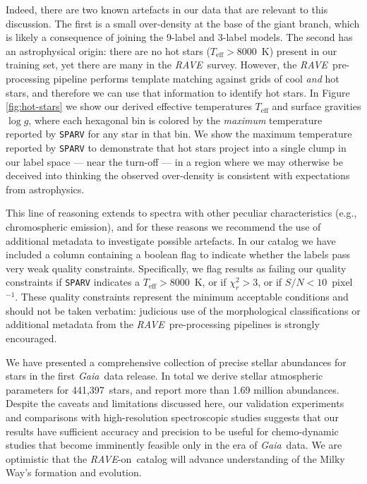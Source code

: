 \documentclass[preprint]{aastex}
\newcommand{\acronym}[1]{{\small{#1}}}
\newcommand{\project}[1]{\textsl{#1}}
\newcommand{\gaia}{\project{Gaia}}
\newcommand{\rave}{\project{\acronym{RAVE}}}
\newcommand{\raveon}{\rave-on}
\newcommand{\teff}{T_{\mathrm{eff}}}
\newcommand{\logg}{\log g}
\newcommand{\ReportedStellarParameters}{441,397} %
\begin{document}
Indeed, there are two known artefacts in our data that are relevant to this 
discussion. The first is a small over-density at the base of the giant branch, 
which is likely a consequence of joining the 9-label and 3-label models.  The
second has an astrophysical origin: there are no hot stars ($\teff > 8000$~K)
present in our training set, yet there are many in the \rave\ survey.
However, the \rave\ pre-processing pipeline 
\citep[\texttt{SPARV};][]{Steinmetz_2006,Zwitter_2008} performs template 
matching against grids of cool \emph{and} hot stars, and therefore we can use 
that information to identify hot stars.  In Figure \ref{fig:hot-stars} 
we show our derived effective temperatures $\teff$ and surface gravities $\logg$,
where each hexagonal bin is colored by the \emph{maximum} temperature
reported by \texttt{SPARV} for any star in that bin.  We show the maximum
temperature reported by \texttt{SPARV} to demonstrate that hot stars project
into a single clump in our label space --- near the turn-off --- in a region
where we may otherwise be deceived into thinking the observed over-density
is consistent with expectations from astrophysics.  


This line of reasoning extends to spectra with other peculiar characteristics 
(e.g., chromospheric emission), and for these reasons we recommend the use of
additional metadata to investigate possible artefacts.  In our catalog we have
included a column containing a boolean flag to indicate whether the labels pass
very weak quality constraints.  Specifically, we flag results as failing our
quality constraints if \texttt{SPARV} indicates a $\teff > 8000$~K, or if 
$\chi_r^2 > 3$, or if $S/N < 10$~pixel$^{-1}$.  These quality constraints 
represent the minimum acceptable conditions and should not be taken verbatim: 
judicious use of the morphological classifications \citep{Matijevic_2012} or 
additional metadata from the \rave\ pre-processing pipelines is strongly 
encouraged.


We have presented a comprehensive collection of precise stellar abundances 
for stars in the first \gaia\ data release.  In total we derive stellar 
atmospheric parameters for \ReportedStellarParameters\ stars, and report more 
than 1.69 million abundances.  Despite the caveats and limitations discussed here, 
our validation experiments and comparisons with high-resolution spectroscopic
studies suggests that our results have sufficient accuracy and precision to
be useful for chemo-dynamic studies that become imminently feasible only in
the era of \gaia\ data.  We are optimistic that the \raveon\ catalog will 
advance understanding of the Milky Way's formation and evolution.
\end{document}
